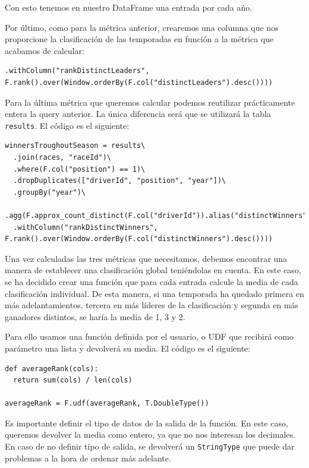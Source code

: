 \documentclass[12pt,twoside,titlepage]{report}
\begin{document}
Con esto tenemos en nuestro DataFrame una entrada por cada año.

Por último, como para la métrica anterior, crearemos una columna que nos proporcione la clasificación de las temporadas en función a la métrica que acabamos de calcular:

\begin{lstlisting}
.withColumn("rankDistinctLeaders", F.rank().over(Window.orderBy(F.col("distinctLeaders").desc())))  
\end{lstlisting}

Para la última métrica que queremos calcular podemos reutilizar prácticamente entera la query anterior. La única diferencia será que se utilizará la tabla \texttt{results}. El código es el siguiente:

\begin{lstlisting}
winnersTroughoutSeason = results\
  .join(races, "raceId")\
  .where(F.col("position") == 1)\
  .dropDuplicates(["driverId", "position", "year"])\
  .groupBy("year")\
  .agg(F.approx_count_distinct(F.col("driverId")).alias("distinctWinners"))\
  .withColumn("rankDistinctWinners", F.rank().over(Window.orderBy(F.col("distinctWinners").desc())))
\end{lstlisting}

Una vez calculadas las tres métricas que necesitamos, debemos encontrar una manera de establecer una clasificación global teniéndolas en cuenta. En este caso, se ha decidido crear una función que para cada entrada calcule la media de cada clasificación individual. De esta manera, si una temporada ha quedado primera en más adelantamientos, tercera en más líderes de la clasificación y segunda en más ganadores distintos, se haría la media de 1, 3 y 2.

Para ello usamos una función definida por el usuario, o UDF que recibirá como parámetro una lista y devolverá su media. El código es el siguiente:

\begin{lstlisting}
def averageRank(cols):
  return sum(cols) / len(cols)

averageRank = F.udf(averageRank, T.DoubleType())
\end{lstlisting}

Es importante definir el tipo de datos de la salida de la función. En este caso, queremos devolver la media como entero, ya que no nos interesan los decimales. En caso de no definir tipo de salida, se devolverá un \texttt{StringType} que puede dar problemas a la hora de ordenar más adelante.
\end{document}
